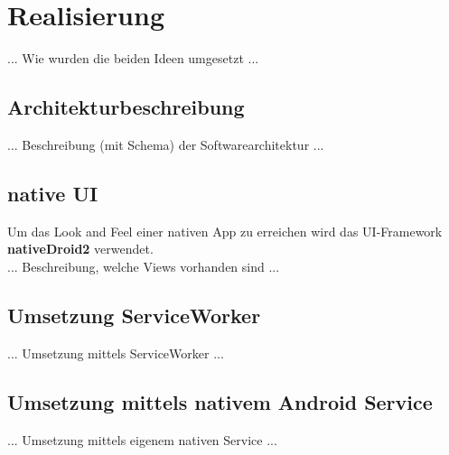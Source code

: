 \section{Realisierung}

... Wie wurden die beiden Ideen umgesetzt ...

\subsection{Architekturbeschreibung}

... Beschreibung (mit Schema) der Softwarearchitektur ...

\subsection{native UI}

Um das \glqq{}Look and Feel\grqq{} einer nativen App zu erreichen wird das UI-Framework \textbf{nativeDroid2} verwendet. \\

... Beschreibung, welche Views vorhanden sind ...

\subsection{Umsetzung ServiceWorker}

... Umsetzung mittels ServiceWorker ...

\subsection{Umsetzung mittels nativem Android Service}

... Umsetzung mittels eigenem nativen Service ...